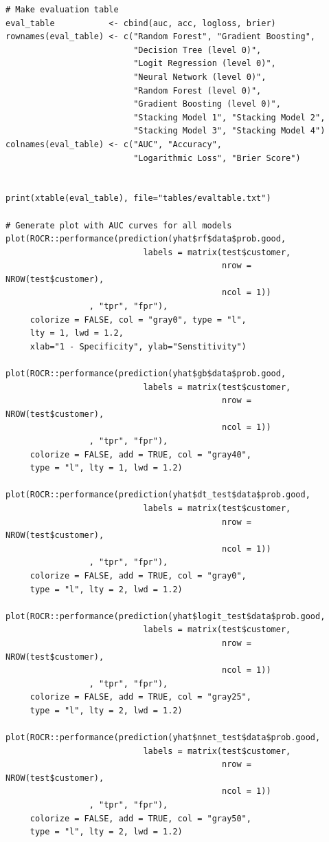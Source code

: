 \documentclass[12pt]{article}
\begin{document}
\begin{lstlisting}
# Make evaluation table
eval_table           <- cbind(auc, acc, logloss, brier)
rownames(eval_table) <- c("Random Forest", "Gradient Boosting", 
                          "Decision Tree (level 0)", 
                          "Logit Regression (level 0)",
                          "Neural Network (level 0)", 
                          "Random Forest (level 0)", 
                          "Gradient Boosting (level 0)",
                          "Stacking Model 1", "Stacking Model 2", 
                          "Stacking Model 3", "Stacking Model 4")
colnames(eval_table) <- c("AUC", "Accuracy", 
                          "Logarithmic Loss", "Brier Score")


print(xtable(eval_table), file="tables/evaltable.txt")

# Generate plot with AUC curves for all models
plot(ROCR::performance(prediction(yhat$rf$data$prob.good, 
                            labels = matrix(test$customer, 
                                            nrow = NROW(test$customer), 
                                            ncol = 1))
                 , "tpr", "fpr"),
     colorize = FALSE, col = "gray0", type = "l",
     lty = 1, lwd = 1.2,
     xlab="1 - Specificity", ylab="Senstitivity")

plot(ROCR::performance(prediction(yhat$gb$data$prob.good, 
                            labels = matrix(test$customer, 
                                            nrow = NROW(test$customer), 
                                            ncol = 1))
                 , "tpr", "fpr"),
     colorize = FALSE, add = TRUE, col = "gray40",
     type = "l", lty = 1, lwd = 1.2)

plot(ROCR::performance(prediction(yhat$dt_test$data$prob.good, 
                            labels = matrix(test$customer, 
                                            nrow = NROW(test$customer), 
                                            ncol = 1))
                 , "tpr", "fpr"),
     colorize = FALSE, add = TRUE, col = "gray0",
     type = "l", lty = 2, lwd = 1.2)

plot(ROCR::performance(prediction(yhat$logit_test$data$prob.good, 
                            labels = matrix(test$customer, 
                                            nrow = NROW(test$customer), 
                                            ncol = 1))
                 , "tpr", "fpr"),
     colorize = FALSE, add = TRUE, col = "gray25", 
     type = "l", lty = 2, lwd = 1.2)

plot(ROCR::performance(prediction(yhat$nnet_test$data$prob.good, 
                            labels = matrix(test$customer, 
                                            nrow = NROW(test$customer), 
                                            ncol = 1))
                 , "tpr", "fpr"),
     colorize = FALSE, add = TRUE, col = "gray50", 
     type = "l", lty = 2, lwd = 1.2)


\end{lstlisting}
\end{document}

